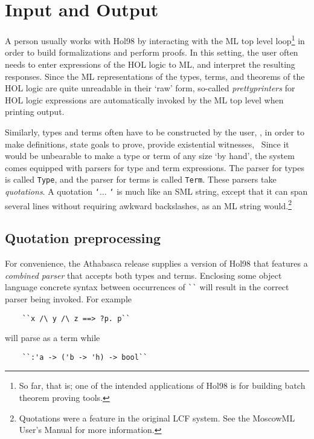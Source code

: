 \section{Input and Output}

A person usually works with Hol98  by interacting with the ML top level
loop\footnote{So far, that is; one of the intended applications of Hol98
is for building batch theorem proving tools.} in order to build
formalizations and perform proofs. In this setting, the user often needs
to enter expressions of the HOL logic to ML, and interpret the resulting
responses. Since the ML representations of the types, terms, and
theorems of the HOL logic are quite unreadable in their `raw' form,
so-called {\it prettyprinters\/} for HOL logic expressions are
automatically invoked by the ML top level when printing output.

Similarly, types and terms often have to be constructed by the user,
\eg, in order to make definitions, state goals to prove, provide
existential witnesses, \etc\ Since it would be unbearable to make a type
or term of any size `by hand', the system comes equipped with parsers
for type and term expressions. The parser for types is called
\verb+Type+, and the parser for terms is called \verb+Term+. These
parsers take {\it quotations\/}.  A quotation {\tt `}$\ldots$ {\tt `} is
much like an SML string, except that it can span several lines without
requiring awkward backslashes, as an ML string
would.\footnote{Quotations were a feature in the original LCF
system. See the MoscowML User's Manual for more information.}

\subsection{Quotation preprocessing}

For convenience, the Athabasca release supplies a version of Hol98 that
features a {\it combined parser\/} that accepts both types and
terms. Enclosing some object language concrete syntax between
occurrences of \verb+``+ will result in the correct parser being
invoked. For example 

\begin{verbatim}
    ``x /\ y /\ z ==> ?p. p``
\end{verbatim}

\noindent will parse as a term while 

\begin{verbatim}
    ``:'a -> ('b -> 'h) -> bool``
\end{verbatim} 

